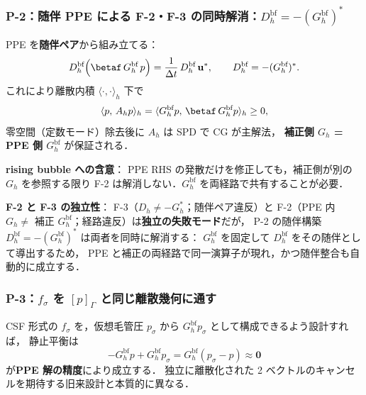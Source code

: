 \subsubsection{P-2：随伴 PPE による F-2・F-3 の同時解消：$D_h^\text{bf} = -(G_h^\text{bf})^\ast$}
\label{sec:bf_p2_adjoint}

PPE を\textbf{随伴ペア}から組み立てる：
\begin{equation}
  D_h^\text{bf}\Bigl(\betaf\,G_h^\text{bf}\,p\Bigr)
    = \frac{1}{\Delta t}\,D_h^\text{bf}\,\mathbf{u}^*,
  \qquad D_h^\text{bf} = -(G_h^\text{bf})^\ast.
  \label{eq:bf_p2_ppe}
\end{equation}
これにより離散内積 $\langle\cdot,\cdot\rangle_h$ 下で
\begin{equation}
  \langle p,\,A_h p\rangle_h
    = \langle G_h^\text{bf} p,\,\betaf\,G_h^\text{bf} p\rangle_h
    \ge 0,
  \label{eq:bf_p2_spd}
\end{equation}
零空間（定数モード）除去後に $A_h$ は SPD で CG が主解法，
\textbf{補正側 $G_h$ = PPE 側 $G_h^\text{bf}$} が保証される．

\noindent\textbf{rising bubble への含意}：
PPE RHS の発散だけを修正しても，補正側が別の $G_h$ を参照する限り
F-2 は解消しない．$G_h^\text{bf}$ を両経路で共有することが必要．

\noindent\textbf{F-2 と F-3 の独立性}：
F-3（$D_h\neq -G_h^\ast$；随伴ペア違反）と
F-2（PPE 内 $G_h\neq$ 補正 $G_h^\text{bf}$；経路違反）は\textbf{独立の失敗モード}だが，
P-2 の随伴構築 $D_h^\text{bf}=-(G_h^\text{bf})^\ast$ は両者を同時に解消する：
$G_h^\text{bf}$ を固定して $D_h^\text{bf}$ をその随伴として導出するため，
PPE と補正の両経路で同一演算子が現れ，かつ随伴整合も自動的に成立する．

\subsubsection{P-3：$f_\sigma$ を $[p]_\Gamma$ と同じ離散幾何に通す}
\label{sec:bf_p3_geometry}

CSF 形式の $f_\sigma$ を，仮想毛管圧 $p_\sigma$ から
$G_h^\text{bf} p_\sigma$ として構成できるよう設計すれば，
静止平衡は
\begin{equation}
  -G_h^\text{bf} p + G_h^\text{bf} p_\sigma
    = G_h^\text{bf}(p_\sigma - p) \approx \mathbf{0}
  \label{eq:bf_p3_cancel}
\end{equation}
が\textbf{PPE 解の精度}により成立する．
独立に離散化された 2 ベクトルのキャンセルを期待する旧来設計と本質的に異なる．

